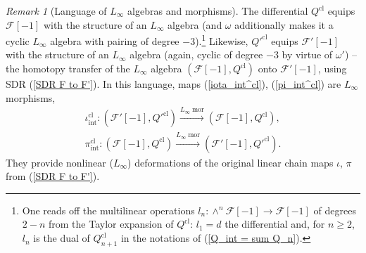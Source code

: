 \documentclass{amsart}
\theoremstyle{plain} %
\theoremstyle{definition}
\theoremstyle{remark}
\newtheorem{rem}[thm]{Remark}
\newcommand{\mr}{\mathrm}
\newcommand{\ra}{\rightarrow}
\newcommand{\F}{\mathcal{F}}
\newcommand{\xra}{\xrightarrow}
\newcommand{\ii}{\mathrm{int}}
\newcommand{\cl}{\mathrm{cl}}
\begin{document}
\begin{rem}[Language of $L_\infty$ algebras and morphisms]
\label{rem: L_infty language}
    The differential $Q^\cl$ equips $\F[-1]$ with the structure of an $L_\infty$ algebra (and $\omega$ additionally makes it a cyclic $L_\infty$ algebra with pairing of degree $-3$).\footnote{
    One reads off the multilinear operations $l_n\colon \wedge^n \F[-1]\ra \F[-1]$ of degrees $2-n$ from the Taylor expansion of $Q^\cl$: $l_1=d$ the differential and, for $n\geq 2$, $l_n$ is the dual of $Q^\cl_{n+1}$ in the notations of (\ref{Q_int = sum Q_n}).
    } Likewise, $Q'^\cl$ equips $\F'[-1]$ with the structure of an $L_\infty$ algebra (again, cyclic of degree $-3$ by virtue of $\omega'$) -- the homotopy transfer of the $L_\infty$ algebra $(\F[-1],Q^\cl)$ onto $\F'[-1]$, using SDR (\ref{SDR F to F'}). In this language, maps (\ref{iota_int^cl}), (\ref{pi_int^cl}) are $L_\infty$ morphisms,
    \begin{gather}
        \iota_\ii^\cl\colon (\F'[-1],Q'^\cl)\xra{L_\infty\;\mr{mor}} (\F[-1],Q^\cl), \label{iota^cl_int L_infty morphism}\\
        \pi_\ii^\cl \colon (\F[-1],Q^\cl)\xra{L_\infty\;\mr{mor}} (\F'[-1],Q'^\cl). \label{pi^cl_int L_infty morphism}
        \end{gather}
    They provide nonlinear ($L_\infty$) deformations of the original linear chain maps $\iota$, $\pi$ from (\ref{SDR F to F'}).
\end{rem}

\end{document}
